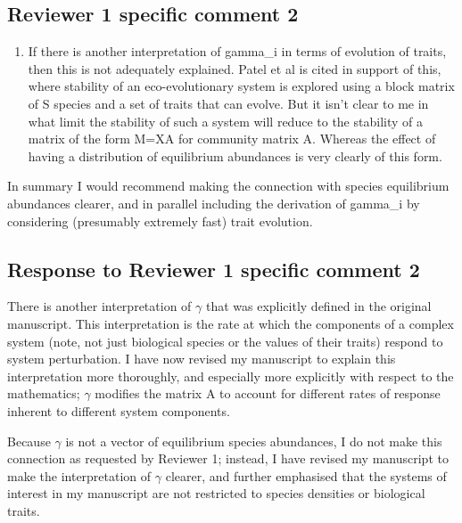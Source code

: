 \documentclass[]{article}
\providecommand{\tightlist}{%
  \setlength{\itemsep}{0pt}\setlength{\parskip}{0pt}}
\begin{document}
\subsection{Reviewer 1 specific comment
2}\label{reviewer-1-specific-comment-2}

\begin{enumerate}
\def\labelenumi{(\alph{enumi})}
\setcounter{enumi}{1}
\tightlist
\item
  If there is another interpretation of gamma\_i in terms of evolution
  of traits, then this is not adequately explained. Patel et al is cited
  in support of this, where stability of an eco-evolutionary system is
  explored using a block matrix of S species and a set of traits that
  can evolve. But it isn't clear to me in what limit the stability of
  such a system will reduce to the stability of a matrix of the form
  M=XA for community matrix A. Whereas the effect of having a
  distribution of equilibrium abundances is very clearly of this form.
\end{enumerate}

In summary I would recommend making the connection with species
equilibrium abundances clearer, and in parallel including the derivation
of gamma\_i by considering (presumably extremely fast) trait evolution.

\subsection{Response to Reviewer 1 specific comment
2}\label{response-to-reviewer-1-specific-comment-2}

There is another interpretation of \(\gamma\) that was explicitly
defined in the original manuscript. This interpretation is the rate at
which the components of a complex system (note, not just biological
species or the values of their traits) respond to system perturbation. I
have now revised my manuscript to explain this interpretation more
thoroughly, and especially more explicitly with respect to the
mathematics; \(\gamma\) modifies the matrix A to account for different
rates of response inherent to different system components.

Because \(\gamma\) is not a vector of equilibrium species abundances, I
do not make this connection as requested by Reviewer 1; instead, I have
revised my manuscript to make the interpretation of \(\gamma\) clearer,
and further emphasised that the systems of interest in my manuscript are
not restricted to species densities or biological traits.
\end{document}
